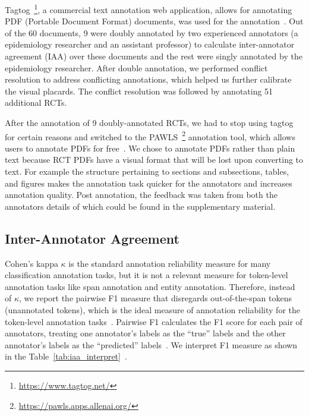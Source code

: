 \documentclass[sn-mathphys,Numbered]{sn-jnl}%
\theoremstyle{thmstyleone}%
\theoremstyle{thmstyletwo}%
\theoremstyle{thmstylethree}%
\begin{document}
Tagtog~\footnote{\url{https://www.tagtog.net/}}, a commercial text annotation web application, allows for annotating PDF (Portable Document Format) documents, was used for the annotation~\cite{cejuela2014tagtog}.
Out of the 60 documents, 9 were doubly annotated by two experienced annotators (a epidemiology researcher and an assistant professor) to calculate inter-annotator agreement (IAA) over these documents and the rest were singly annotated by the epidemiology researcher.
After double annotation, we performed conflict resolution to address conflicting annotations, which helped us further calibrate the visual placards.
The conflict resolution was followed by annotating 51 additional RCTs.


After the annotation of 9 doubly-annotated RCTs, we had to stop using tagtog for certain reasons and switched to the PAWLS~\footnote{\url{https://pawls.apps.allenai.org/}} annotation tool, which allows users to annotate PDFs for free~\cite{neumann2021pawls}.
We chose to annotate PDFs rather than plain text because RCT PDFs have a visual format that will be lost upon converting to text. 
For example the structure pertaining to sections and subsections, tables, and figures makes the annotation task quicker for the annotators and increases annotation quality.
Post annotation, the feedback was taken from both the annotators details of which could be found in the supplementary material. %
%
%
%
\subsection{Inter-Annotator Agreement}
\label{subsec:corpus}
%
Cohen's kappa $\kappa$ is the standard annotation reliability measure for many classification annotation tasks, but it is not a relevant measure for token-level annotation tasks like span annotation and entity annotation.
Therefore, instead of $\kappa$, we report the pairwise F1 measure that disregards out-of-the-span tokens (unannotated tokens), which is the ideal measure of annotation reliability for the token-level annotation tasks~\cite{deleger2012building}.
Pairwise F1 calculates the F1 score for each pair of annotators, treating one annotator's labels as the ``true'' labels and the other annotator's labels as the ``predicted'' labels~\cite{brandsen2020creating}.
We interpret F1 measure as shown in the Table~\ref{tab:iaa_interpret}~\cite{landis1977measurement}.
\end{document}
